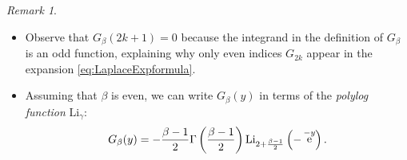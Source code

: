 \documentclass[reqno,a4paper,11pt]{amsart}
\DeclareMathOperator{\ee}{\rm e}
\theoremstyle{definition}
\theoremstyle{remark}
\newtheorem{remark}[theorem]{Remark}
\numberwithin{equation}{section}
\begin{document}
\begin{remark} \hfill
\begin{itemize}
    \item Observe that $G_\beta(2k+1) = 0$ because the integrand in the definition of $G_\beta$ is an odd function, explaining why only even indices $G_{2k}$ appear in the expansion \eqref{eq:LaplaceExpformula}.
    \item Assuming that $\beta$ is even, we can write $G_\beta(y)$ in terms of the \textit{polylog function} $\text{Li}_{\gamma}$:
    \[
        G_\beta(y) 
        = - \frac{\beta - 1}{2} \Gamma \left( \frac{\beta - 1}{2}\right) \text{Li}_{2 + \frac{\beta - 1}{2}} \left(- \ee^{-y}\right).
    \]
\end{itemize}
    
\end{remark}
\end{document}
